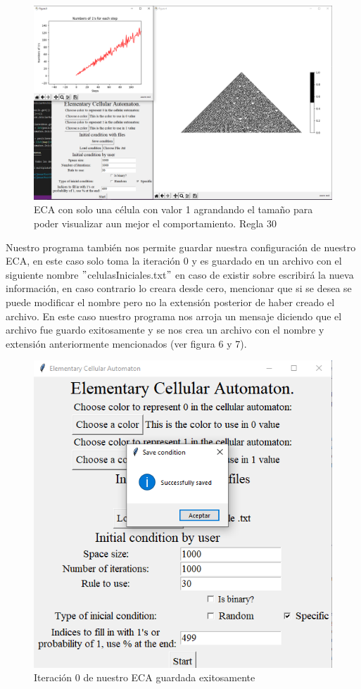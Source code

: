 \documentclass[11pt]{article}
\begin{document}
		\begin{figure}[H]
			\centering
			\includegraphics[scale=0.42]{resources/prueba2.png}
			\caption{ECA con solo una célula con valor 1 agrandando el tamaño para poder visualizar aun mejor el comportamiento. Regla 30}\label{fig:picture}
		\end{figure}
		Nuestro programa también nos permite guardar nuestra configuración de nuestro ECA, en este caso solo toma la iteración 0 y es guardado en un archivo con el siguiente nombre $"$celulasIniciales.txt$"$ en caso de existir sobre escribirá la nueva información, en caso contrario lo creara desde cero, mencionar que si se desea se puede modificar el nombre pero no la extensión posterior de haber creado el archivo. En este caso nuestro programa nos arroja un mensaje diciendo que el archivo fue guardo exitosamente y se nos crea un archivo con el nombre y extensión anteriormente mencionados (ver figura 6 y 7).
		\begin{figure}[H]
			\centering
			\includegraphics[scale=0.42]{resources/archivoSave.png}
			\caption{Iteración 0 de nuestro ECA guardada exitosamente}\label{fig:picture}
		\end{figure}
\end{document}
